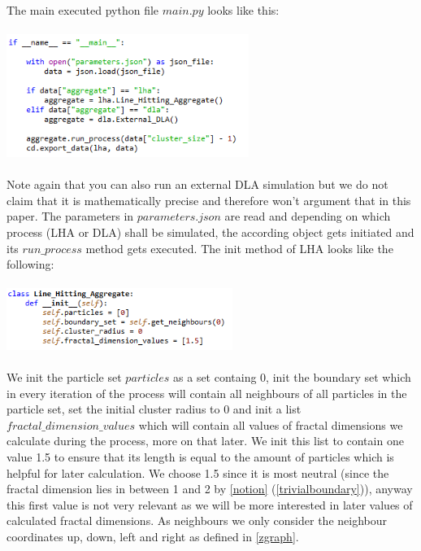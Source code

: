 \documentclass[12pt,a4paper]{scrartcl}
\numberwithin{equation}{subsection}
\newcommand{\1}{\mathbbm{1}}
\numberwithin{equation}{section}
\theoremstyle{definition}
\begin{document}
\\The main executed python file $\mathit{main.py}$ looks like this:\\
\\
\includegraphics[height=4cm]{images/code-snippets/mainpy.png} \\
\\
Note again that you can also run an external DLA simulation but we do not claim that it is mathematically precise and therefore won't argument that in this paper. The parameters in $\mathit{parameters.json}$ are read and depending on which process (LHA or DLA) shall be simulated, the according object gets initiated and its $\mathit{run\_process}$ method gets executed. The init method of LHA looks like the following:\\
\\
\includegraphics[height=2cm]{images/code-snippets/lhainit.png} \\
\\
We init the particle set $\mathit{particles}$ as a set containg $0$, init the boundary set which in every iteration of the process will contain all neighbours of all particles in the particle set, set the initial cluster radius to $0$ and init a list $\mathit{fractal\_dimension\_values}$ which will contain all values of fractal dimensions we calculate during the process, more on that later. We init this list to contain one value 1.5 to ensure that its length is equal to the amount of particles which is helpful for later calculation. We choose 1.5 since it is most neutral (since the fractal dimension lies in between 1 and 2 by \ref{notion} (\ref{trivialboundary})), anyway this first value is not very relevant as we will be more interested in later values of calculated fractal dimensions. As neighbours we only consider the neighbour coordinates up, down, left and right as defined in \ref{zgraph}. \\
\end{document}
